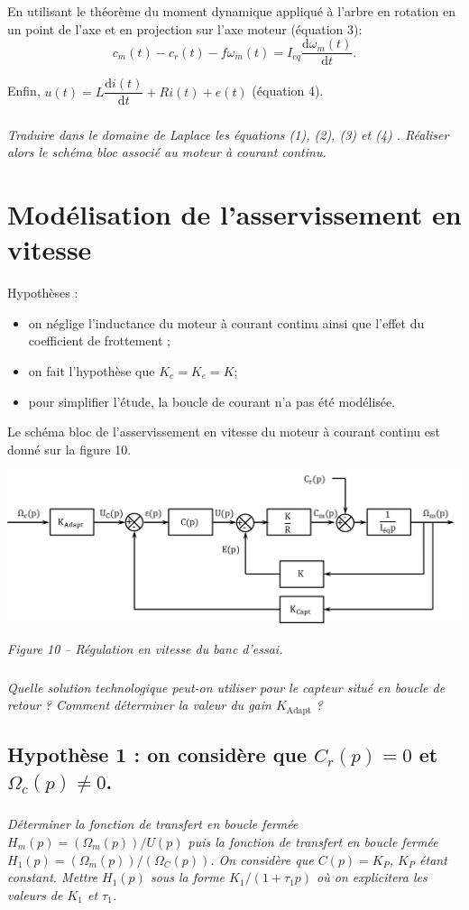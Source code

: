 \documentclass[10pt,fleqn]{article} %
\begin{document}
\begin{multicols}{2}
En utilisant le théorème du moment dynamique appliqué à l'arbre en rotation en un point de l'axe et en projection sur l'axe moteur (équation 3):
$$
c_m(t)-c_r(t)-f\omega_m(t) = I_{eq} \dfrac{\text{d} \omega_m(t)}{\text{d}t}.
$$

Enfin, $u(t)=L\dfrac{\text{d}i(t)}{\text{d}t}+Ri(t)+e(t)$ (équation 4).

\subparagraph{}\textit{Traduire dans le domaine de Laplace les équations (1), (2), (3) et (4) . Réaliser alors le schéma bloc associé au moteur à courant continu.}

\section*{Modélisation de l'asservissement en vitesse}
Hypothèses :
\begin{itemize}
\item on néglige l'inductance du moteur à courant continu ainsi que l'effet du coefficient de frottement ;
\item on fait l'hypothèse que $K_c=K_e =K$;
\item pour simplifier l'étude, la boucle de courant n'a pas été modélisée.
\end{itemize}
Le schéma bloc de l'asservissement en vitesse du moteur à courant continu est donné sur la figure 10.
 

\begin{center}
\includegraphics[width=\linewidth]{images/fig_06}

\textit{Figure 10 -- Régulation en vitesse du banc d'essai.}
\end{center}

\subparagraph{}\textit{Quelle solution technologique peut-on utiliser pour le capteur situé en boucle de retour ? Comment déterminer la valeur du gain $K_{\text{Adapt}}$ ?}

\subsection*{Hypothèse 1 : on considère que $C_r (p)=0$ et $\Omega_c (p)\neq 0$.}
\subparagraph{}\textit{Déterminer la fonction de transfert en boucle fermée $H_m (p)=(\Omega_m (p))/U(p)$ puis la fonction de transfert en boucle fermée $H_1 (p)=(\Omega_m (p))/(\Omega_C (p))$. On considère que $C(p)=K_P$, $K_P$ étant constant. Mettre $H_1 (p)$ sous la forme $K_1/(1+\tau_1 p)$ où on explicitera les valeurs de $K_1$ et $\tau_1$.}


\end{multicols}
\end{document}
